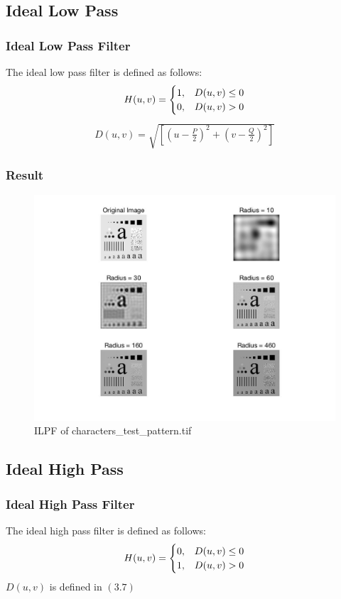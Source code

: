 \documentclass[11pt,oneside]{book}
\begin{document}
\subsection{Ideal Low Pass}
\subsubsection{Ideal Low Pass Filter}
The ideal low pass filter is defined as follows:\\
\begin{eqnarray}H(u,v)=
\begin{cases}
1, &D(u,v)\le0\cr 0, &D(u,v)>0\end{cases}
\end{eqnarray}
\begin{align}
D(u,v)=\sqrt{[(u-\frac{P}{2})^2+(v-\frac{Q}{2})^2]}
\end{align}
\subsubsection{Result}
\begin{figure}[!htb]
   \centering  
   \includegraphics[width=1.0\textwidth]{images/3/ILPF.jpg}
   \caption{ILPF of characters\_test\_pattern.tif}  
\end{figure}

\subsection{Ideal High Pass}
\subsubsection{Ideal High Pass Filter}
The ideal high pass filter is defined as follows:\\
\begin{eqnarray}H(u,v)=
\begin{cases}
0, &D(u,v)\le0\cr 1, &D(u,v)>0\end{cases}
\end{eqnarray}
$D(u,v)$ is defined in $(3.7)$
\end{document}
